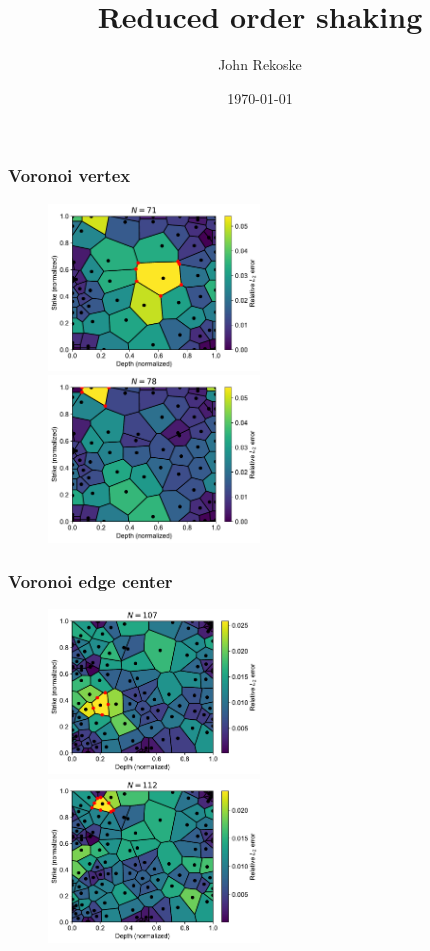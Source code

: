 \documentclass{beamer}
\title{Reduced order shaking}
\author{John Rekoske}
\date{\today}
\begin{document}
    \begin{frame}
        \titlepage
    \end{frame}
    \begin{frame}
        \frametitle{Voronoi vertex}
        \begin{figure}
            \includegraphics[width=0.5\textwidth]{figs/vor_vertex_1.pdf}%
            \includegraphics[width=0.5\textwidth]{figs/vor_vertex_2.pdf}
        \end{figure}
    \end{frame}
    \begin{frame}
        \frametitle{Voronoi edge center}
        \begin{figure}
            \includegraphics[width=0.5\textwidth]{figs/vor_edge_1.pdf}%
            \includegraphics[width=0.5\textwidth]{figs/vor_edge_2.pdf}
        \end{figure}
    \end{frame}
\end{document}
